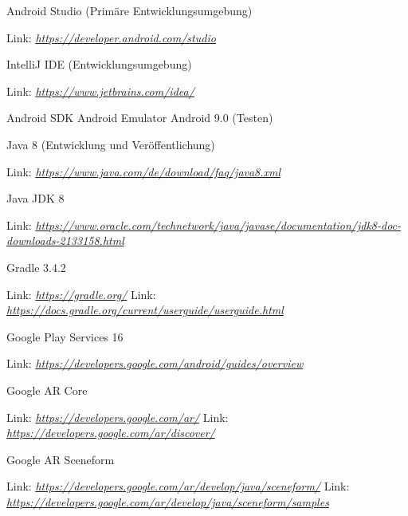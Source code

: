 \documentclass{scrartcl}
\begin{document}
\noindent Android Studio (Primäre Entwicklungsumgebung)

\noindent Link: \textit{\url{https://developer.android.com/studio} \newline}

\noindent IntelliJ IDE  (Entwicklungsumgebung)

\noindent Link: \textit{\url{https://www.jetbrains.com/idea/} \newline}

\noindent Android SDK \newline
\noindent Android Emulator \newline
\noindent Android 9.0 (Testen) \newline 

\noindent Java 8 (Entwicklung und Veröffentlichung)

\noindent Link: \textit{\url{https://www.java.com/de/download/faq/java8.xml} \newline}

\noindent Java JDK 8 

\noindent Link: \textit{\url{https://www.oracle.com/technetwork/java/javase/documentation/jdk8-doc-downloads-2133158.html} \newline}

\noindent Gradle 3.4.2 

\noindent Link: \textit{\url{https://gradle.org/} \newline}
\noindent Link: \textit{\url{https://docs.gradle.org/current/userguide/userguide.html} \newline}

\noindent Google Play Services 16 

\noindent Link: \textit{\url{https://developers.google.com/android/guides/overview} \newline}

\noindent Google AR Core

\noindent Link: \textit{\url{https://developers.google.com/ar/} \newline}
\noindent Link: \textit{\url{https://developers.google.com/ar/discover/} \newline}

\noindent Google AR Sceneform

\noindent Link: \textit{\url{https://developers.google.com/ar/develop/java/sceneform/} \newline}
\noindent Link: \textit{\url{https://developers.google.com/ar/develop/java/sceneform/samples} \newline}
\end{document}

